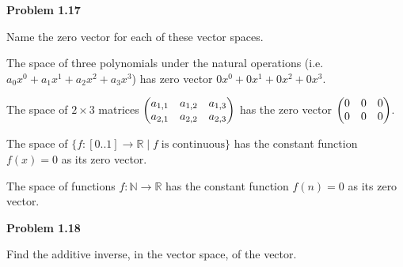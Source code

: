 \documentclass[12pt]{article}
\newenvironment{problem}[1][default]{
  \begin{framed}\begin{minipage}{0.97\textwidth}
  \setlength{\parskip}{4mm}
  {\bf Problem #1}
}{\end{minipage}\end{framed}}
\newenvironment{abc}{\begin{enumerate}[label={\bf(\alph*)}]}{\end{enumerate}}
\newcommand\m[2][]{
	\ifthenelse{\equal {#1} {}}
		{\begin{pmatrix*}[r]#2\end{pmatrix*}}
		{\left(\begin{array}{#1}#2\end{array}\right)}
}
\begin{document}
\begin{problem}[1.17]
Name the zero vector for each of these vector spaces.
\end{problem}

\begin{abc}
\begin{item}
	The space of three polynomials under the natural operations
	(i.e. $a_0x^0 + a_1x^1 + a_2x^2 + a_3x^3$) has zero vector
	$0x^0 + 0x^1 + 0x^2 + 0x^3$.
\end{item}

\begin{item}
	The space of $2 \times 3$ matrices $\m{ a_{1,1} & a_{1,2} & a_{1,3} \\ a_{2,1} & a_{2,2} & a_{2,3}}$
	has the zero vector $\m{0 & 0 & 0 \\ 0 & 0 & 0}$.
\end{item}

\begin{item}
	The space of $\{f: [0..1] \rightarrow \mathbb{R} \mid f \; \text{is continuous}\}$ has the constant function $f(x) = 0$ as its zero vector.
\end{item}

\begin{item}
	The space of functions $f: \mathbb{N} \rightarrow \mathbb{R}$ has the constant function $f(n) = 0$ as its zero vector.
\end{item}
\end{abc}

\begin{problem}[1.18]
	Find the additive inverse, in the vector space, of the vector.
\end{problem}
\end{document}
